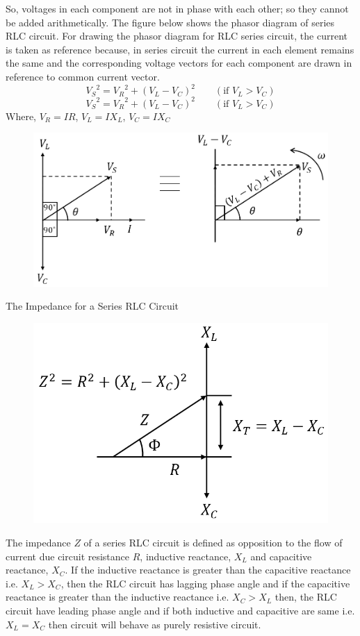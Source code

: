 \documentclass[../main.tex]{subfiles}
\begin{document}
So, voltages in each component are not in phase with each other; so they cannot be added arithmetically. The figure below shows the phasor diagram of series RLC circuit. For drawing the phasor diagram for RLC series circuit, the current is taken as reference because, in series circuit the current in each element remains the same and the corresponding voltage vectors for each component        are        drawn        in        reference        to        common        current         vector.
\[{V_S}^2={V_R}^2+\left( V_L-V_C \right)^2\qquad(\text{if }V_L>V_C)\]
\[{V_S}^2={V_R}^2+\left( V_L-V_C \right)^2\qquad(\text{if }V_L>V_C)\]
Where, $ V_R=IR $, $ V_L=IX_L $, $ V_C=IX_C $
\begin{figure}[ht]
    \centering
    \includegraphics[scale=1]{phasor-1.png}
\end{figure}
The Impedance for a Series RLC Circuit
\begin{figure}[ht]
    \centering
    \includegraphics[scale=.75]{phasor-1.1.png}
\end{figure}
The impedance $ Z $ of a series RLC circuit is defined as opposition to the flow of current due circuit resistance $ R $, inductive reactance, $ X_L $ and capacitive reactance, $ X_C $. If the inductive reactance is greater than the capacitive reactance i.e. $ X_L > X_C $, then the RLC circuit has lagging phase angle and if the capacitive reactance is greater than the inductive reactance i.e. $ X_C > X_L $ then, the RLC circuit have leading phase angle and if both inductive and capacitive are same i.e. $ X_L = X_C $ then circuit will behave as purely resistive circuit.
\end{document}
